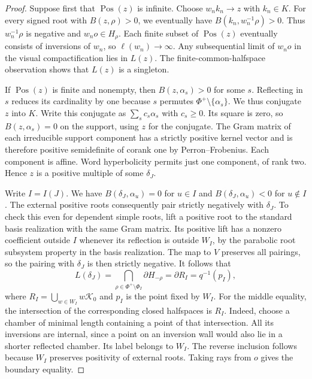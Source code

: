 \documentclass[11pt,reqno]{amsart}
\theoremstyle{plain}
\theoremstyle{definition}
\theoremstyle{remark}
\numberwithin{equation}{section}
\begin{document}
\begin{proof}
Suppose first that $\operatorname{Pos}(z)$ is infinite. Choose
$w_nk_n\to z$ with $k_n\in K$. For every signed root with
$B(z,\rho)>0$, we eventually have $B(k_n,w_n^{-1}\rho)>0$.
Thus $w_n^{-1}\rho$ is negative and $w_no\in H_\rho$. Each finite
subset of $\operatorname{Pos}(z)$ eventually consists of inversions of
$w_n$, so $\ell(w_n)\to\infty$. Any subsequential limit of $w_no$ in
the visual compactification lies in $L(z)$. The finite-common-halfspace
observation shows that $L(z)$ is a singleton.

If $\operatorname{Pos}(z)$ is finite and nonempty, then
$B(z,\alpha_s)>0$ for some $s$. Reflecting in $s$ reduces its
cardinality by one because $s$ permutes
$\Phi^+\setminus\{\alpha_s\}$. We thus conjugate $z$ into $K$.
Write this conjugate as $\sum_s c_s\alpha_s$ with $c_s\geq0$.
Its square is zero, so $B(z,\alpha_s)=0$ on the support, using $z$
for the conjugate. The Gram matrix of each irreducible support
component has a strictly positive kernel vector and is therefore
positive semidefinite of corank one by Perron--Frobenius. Each
component is affine. Word hyperbolicity permits just one component,
of rank two. Hence $z$ is a positive multiple of some $\delta_J$.

Write $I=I(J)$. We have $B(\delta_J,\alpha_u)=0$ for $u\in I$
and $B(\delta_J,\alpha_u)<0$ for $u\notin I$. The external positive
roots consequently pair strictly negatively with $\delta_J$.
To check this even for dependent simple roots, lift a positive root
to the standard basis realization with the same Gram matrix. Its
positive lift has a nonzero coefficient outside $I$ whenever its
reflection is outside $W_I$, by the parabolic root subsystem
property in the basis realization. The map to $V$ preserves all
pairings, so the pairing with $\delta_J$ is then strictly negative. It follows that
\[
  L(\delta_J)=
  \bigcap_{\rho\in\Phi^+\setminus\Phi_I}\partial H_{-\rho}
  =\partial R_I=q^{-1}(p_I),
\]
where $R_I=\bigcup_{w\in W_I}w\mathcal K_0$ and $p_I$ is the point
fixed by $W_I$. For the middle equality, the intersection of the
corresponding closed halfspaces is $R_I$. Indeed, choose a chamber
of minimal length containing a point of that intersection. All its
inversions are internal, since a point on an inversion wall would
also lie in a shorter reflected chamber. Its label belongs to $W_I$.
The reverse inclusion follows because $W_I$ preserves positivity
of external roots. Taking rays from $o$ gives the boundary equality.


\end{proof}
\end{document}
